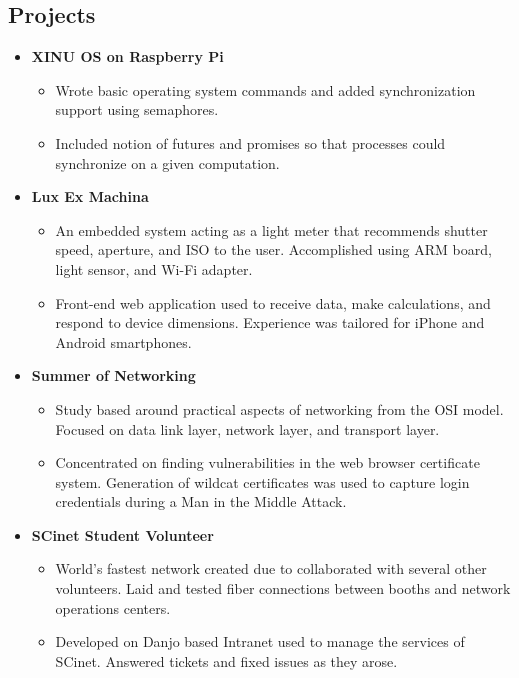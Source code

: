 \documentclass[12pt,letterpaper]{article}
\begin{document}
\subsection*{Projects}

\begin{itemize}
  \item \textbf{XINU OS on Raspberry Pi}
  \begin{itemize}

    \item Wrote basic operating system commands and added synchronization support using semaphores.

    \item Included notion of futures and promises so that processes could synchronize on a given computation.

  \end{itemize}

  \item \textbf{Lux Ex Machina}
  \begin{itemize}

    \item An embedded system acting as a light meter that recommends shutter speed,
    aperture, and ISO to the user. Accomplished using ARM board, light sensor, and
    Wi-Fi adapter.

    \item Front-end web application used to receive data, make calculations, and
    respond to device dimensions. Experience was tailored for iPhone and Android smartphones.

  \end{itemize}

  \item \textbf{Summer of Networking}
  \begin{itemize}

    \item Study based around practical aspects of networking from the OSI model.
    Focused on data link layer, network layer, and transport layer.

    \item Concentrated on finding vulnerabilities in the web browser certificate system.
    Generation of wildcat certificates was used to capture login credentials during a Man in the Middle Attack.

  \end{itemize}

  \item \textbf{SCinet Student Volunteer}
  \begin{itemize}

    \item World's fastest network created due to collaborated with several other volunteers.
    Laid and tested fiber connections between booths and network operations centers.

    \item Developed on Danjo based Intranet used to manage the services of SCinet.
    Answered tickets and fixed issues as they arose.

  \end{itemize}

\end{itemize}
\end{document}
